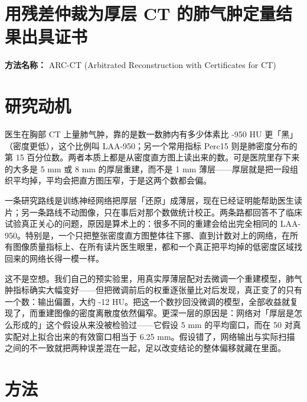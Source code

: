 \documentclass[10pt,a4paper]{article}
\begin{document}
\section*{用残差仲裁为厚层 CT 的肺气肿定量结果出具证书}
\textbf{方法名称：} ARC-CT (Arbitrated Reconstruction with Certificates for CT)
\section*{研究动机}
医生在胸部 CT 上量肺气肿，靠的是数一数肺内有多少体素比 -950 HU 更「黑」（密度更低），这个比例叫 LAA-950；另一个常用指标 Perc15 则是肺密度分布的第 15 百分位数。两者本质上都是从密度直方图上读出来的数。可是医院里存下来的大多是 5 mm 或 8 mm 的厚层重建，而不是 1 mm 薄层------厚层就是把一段组织平均掉，平均会把直方图压窄，于是这两个数都会偏。

一条研究路线是训练神经网络把厚层「还原」成薄层，现在已经证明能帮助医生读片；另一条路线不动图像，只在事后对那个数做统计校正。两条路都回答不了临床试验真正关心的问题，原因是算术上的：很多不同的重建会给出完全相同的 LAA-950。特别是，一个只把整张密度直方图整体往下挪、直到计数对上的网络，在所有图像质量指标上、在所有读片医生眼里，都和一个真正把平均掉的低密度区域找回来的网络长得一模一样。

这不是空想。我们自己的预实验里，用真实厚薄层配对去微调一个重建模型，肺气肿指标确实大幅变好------但把微调前后的权重逐张量比对后发现，真正变了的只有一个数：输出偏置，大约 -12 HU。把这一个数抄回没微调的模型，全部收益就复现了，而重建图像的密度离散度依然偏窄。更深一层的原因是：网络对「厚层是怎么形成的」这个假设从来没被检验过------它假设 5 mm 的平均窗口，而在 50 对真实配对上拟合出来的有效窗口相当于 6.25 mm。假设错了，网络输出与实际扫描之间的不一致就把两种误差混在一起，足以改变结论的整体偏移就藏在里面。
\section*{方法}
\end{document}
